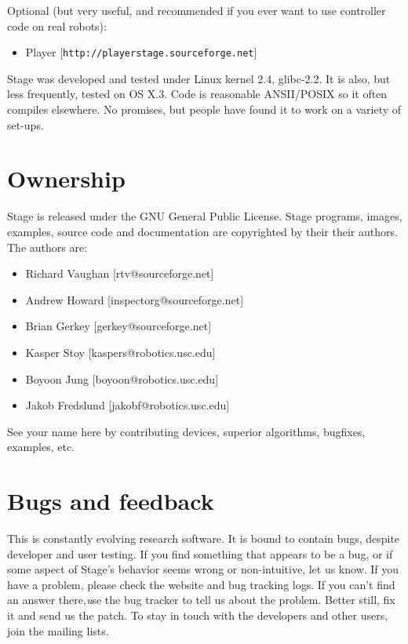 \documentclass[11pt,twoside]{report}
\def\HOMEPAGE {{\tt http://playerstage.sourceforge.net}}
\begin{document}
    Optional (but very useful, and recommended if you ever want to use
    controller code on real robots):
    \begin{itemize}
    \item Player [\HOMEPAGE]
        \end{itemize}

    Stage was developed and tested under Linux kernel 2.4,
    glibc-2.2. It is also, but less frequently, tested on OS X.3. Code
    is reasonable ANSII/POSIX so it often compiles elsewhere. No
    promises, but people have found it to work on a variety of
    set-ups. 
  
  \section{Ownership}

    Stage is released under the GNU General Public
    License. Stage programs, images, examples, source code and
    documentation are copyrighted by their their authors. The authors are:

      \begin{itemize}
      \item[] Richard Vaughan [rtv@sourceforge.net]
      \item[] Andrew Howard [inspectorg@sourceforge.net]
      \item[] Brian Gerkey [gerkey@sourceforge.net]
      \item[] Kasper Stoy [kaspers@robotics.usc.edu]
      \item[] Boyoon Jung [boyoon@robotics.usc.edu]
      \item[] Jakob Fredslund [jakobf@robotics.usc.edu]
      \end{itemize}

        See your name here by contributing devices, superior
        algorithms, bugfixes, examples, etc.

  \section{Bugs and feedback}
  
    This is constantly evolving research software. It is bound to
    contain bugs, despite developer and user testing.  If you find
    something that appears to be a bug, or if some aspect of Stage's
    behavior seems wrong or non-intuitive, let us know. If you have a
    problem, please check the website and bug tracking logs. If you
    can't find an answer there,{\emph use the bug tracker} to tell us about
    the problem. Better still, fix it and send us the patch. To stay
    in touch with the developers and other users, join the mailing
    lists.
\end{document}
